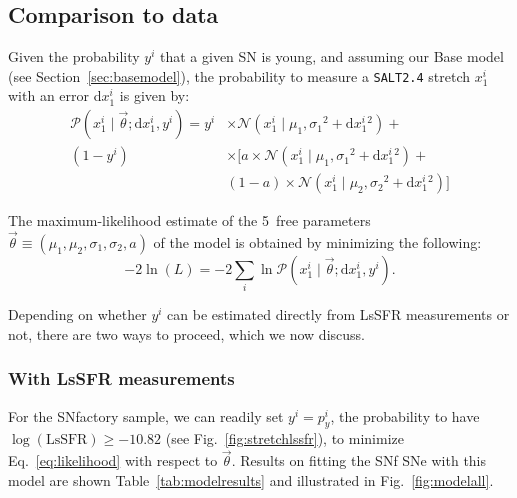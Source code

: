 \documentclass[referee]{aa}
\newcommand{\prob}[2]{\mathcal{P}\left( #1 \mid #2\right)}
\begin{document}
\subsection{Comparison to data}\label{sec:basemodelapplied}

Given the probability $y^i$ that a given SN is young, and assuming our Base
model (see Section~\ref{sec:basemodel}), the probability to measure a
\textsc{\texttt{SALT2.4}} stretch $x_1^i$ with an error d$x_1^i$ is given by:
\begin{align}\label{eq:likelihoodsnf}
    \prob{x^i_1}{\vec{\theta}; \mathrm{d}x^i_1, y^i} =
    y^i & \times
    \mathcal{N}\left(x^i_1 \mid \mu_1, \sigma_1{}^2+\mathrm{d}x^i_1{}^2\right) +
    \nonumber\\
    (1-y^i) &\times \bigg[
    a \times \mathcal{N}\left(x^i_1 \mid \mu_1,
    \sigma_1{}^2+\mathrm{d}x^i_1{}^2\right) +
    \nonumber\\
    & (1-a) \times \mathcal{N}\left(x^i_1 \mid \mu_2,
    \sigma_2{}^{2}+\mathrm{d}x^i_1{}^2\right) \bigg]
\end{align}

The maximum-likelihood estimate of the 5~free parameters
$\vec{\theta}\equiv({\mu_1,\mu_2,\sigma_1,\sigma_2,a})$ of the model is obtained
by minimizing the following:
\begin{equation}\label{eq:likelihood}
    -2\ln(L) = -2 \sum_i \ln \prob{x_1^i}{\vec{\theta};
    \mathrm{d}x_1^i, y^i}.
\end{equation}

Depending on whether $y^i$ can be estimated directly from LsSFR measurements or
not, there are two ways to proceed, which we now discuss.

\subsubsection{With LsSFR measurements}\label{sec:modelpy}

For the SNfactory sample, we can readily set $y^i = p^i_y$, the probability to
have $\log(\textrm{LsSFR}) \geq -10.82$ (see Fig.~\ref{fig:stretchlssfr}), to
minimize Eq.~\ref{eq:likelihood} with respect to $\vec{\theta}$. Results on
fitting the SNf SNe with this model are shown Table~\ref{tab:modelresults} and
illustrated in Fig.~\ref{fig:modelall}.
\end{document}
